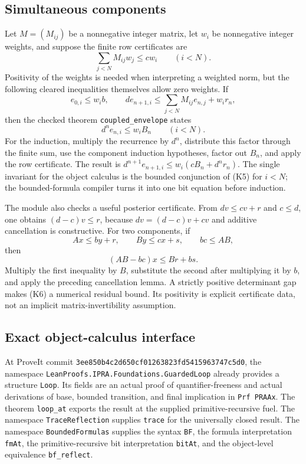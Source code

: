 \subsection{Simultaneous components}

Let \(M=(M_{ij})\) be a nonnegative integer matrix, let \(w_i\) be
nonnegative integer weights, and suppose the finite row certificates are
\[
 \sum_{j<N}M_{ij}w_j\le c w_i\qquad(i<N).
\]
Positivity of the weights is needed when interpreting a weighted norm,
but the following cleared inequalities themselves allow zero weights.
If
\[
 e_{0,i}\le w_i b,\qquad
 d e_{n+1,i}\le\sum_{j<N}M_{ij}e_{n,j}+w_i r_n,
\]
then the checked theorem \texttt{coupled\_envelope} states
\[
 d^n e_{n,i}\le w_iB_n\qquad(i<N).                    \tag{K5}
\]
For the induction, multiply the recurrence by \(d^n\), distribute this
factor through the finite sum, use the component induction hypotheses,
factor out \(B_n\), and apply the row certificate.  The result is
\(d^{n+1}e_{n+1,i}\le w_i(cB_n+d^nr_n)\).
The single invariant for the object calculus is the bounded conjunction
of (K5) for \(i<N\); the bounded-formula compiler turns it into one bit
equation before induction.

The module also checks a useful posterior certificate.  From
\(dv\le cv+r\) and \(c\le d\), one obtains
\((d-c)v\le r\), because
\(dv=(d-c)v+cv\) and additive cancellation is constructive.
For two components, if
\[
 Ax\le by+r,\qquad By\le cx+s,\qquad bc\le AB,
\]
then
\[
 (AB-bc)x\le Br+bs.                                  \tag{K6}
\]
Multiply the first inequality by \(B\), substitute the second after
multiplying it by \(b\), and apply the preceding cancellation lemma.
A strictly positive determinant gap makes (K6) a numerical residual
bound.  Its positivity is explicit certificate data, not an implicit
matrix-invertibility assumption.

\subsection{Exact object-calculus interface}

At ProveIt commit
\texttt{3ee850b4c2d650cf01263823fd5415963747c5d0}, the namespace
\texttt{LeanProofs.IPRA.Foundations.GuardedLoop} already provides a
structure \texttt{Loop}. Its fields are an actual proof of
quantifier-freeness and actual derivations of base, bounded transition,
and final implication in \texttt{Prf PRAAx}. The theorem
\texttt{loop\_at} exports the result at the supplied primitive-recursive
fuel. The namespace \texttt{TraceReflection} supplies \texttt{trace} for
the universally closed result. The namespace \texttt{BoundedFormulas}
supplies the syntax \texttt{BF}, the formula interpretation
\texttt{fmAt}, the primitive-recursive bit interpretation \texttt{bitAt},
and the object-level equivalence \texttt{bf\_reflect}.

